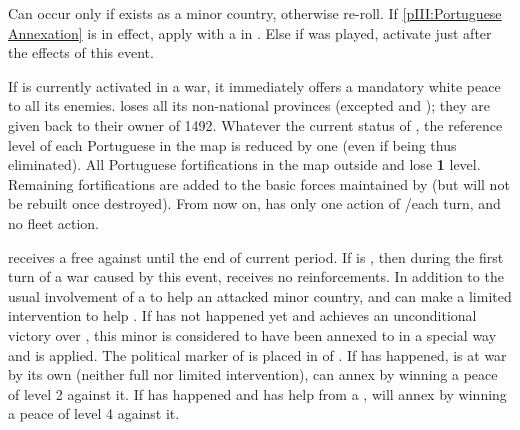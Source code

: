
\condition{}
\aparag Can occur only if \paysportugal exists as a minor country, otherwise
re-roll.
\aparag If \ref{pIII:Portuguese Annexation} is in effect, apply \RD with a
\REVOLT in \SPA.
\aparag Else if  was played, activate
 just after the effects of this event.

\phevnt
\aparag If \paysPortugal is currently activated in a war, it immediately
offers a mandatory white peace to all its enemies.
\aparag \paysPortugal loses all its non-national provinces (excepted
\provinceTanger and \provinceAcores); they are given back to their owner of
1492.
\aparag Whatever the current status of \paysPortugal, the reference level of
each Portuguese \TradeFLEET in the \ROTW map is reduced by one (even if being
thus eliminated).
\aparag All Portuguese fortifications in the \ROTW map outside
 and  lose {\bf 1} level.  Remaining
fortifications are added to the basic forces maintained by \paysPortugal (but
will not be rebuilt once destroyed).
\aparag From now on, \paysPortugal has only one action of \TP/\COL each turn,
and no fleet action.






\phevnt
\aparag \SPA receives a free \CB against \paysPortugal until the end of
current period.  If \SPA is \CATHCR, then during the first turn of a war
caused by this event, \paysPortugal receives no reinforcements.
\aparag In addition to the usual involvement of a \MAJ to help an attacked
minor country, \ENG and \FRA can make a limited intervention to help
\paysPortugal.
\aparag[Annexation]
\bparag If  has not happened yet and \SPA
achieves an unconditional victory over \paysPortugal, this minor is considered
to have been annexed to \SPA in a special way and  is applied. The political marker of 
is placed in \ANNEXION of \SPA.
\bparag If  has happened, \paysPortugal is
at war by its own (neither full nor limited intervention), \SPA can annex
\paysPortugal by winning a peace of level 2 against it.
\bparag If  has happened and \paysPortugal
has help from a \MAJ, \SPA will annex \paysPortugal by winning a peace of
level 4 against it.


